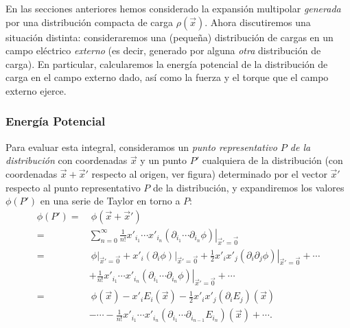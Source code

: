 En las secciones anteriores hemos considerado la expansión multipolar
\textit{generada} por una distribución compacta de carga
$\rho(\vec{x})$. Ahora discutiremos una situación distinta: consideraremos
una (peque\~na) distribución de cargas en un campo eléctrico
\textit{externo} (es decir, generado por alguna \textit{otra} distribución de
carga). En particular, calcularemos la energía potencial de la
distribución de carga en el campo externo dado, así como la fuerza y el
torque que el campo externo ejerce.

\subsubsection{Energía Potencial} \label{ed3_3_1}


Para evaluar esta integral, consideramos un \textit{punto representativo $P$ de la
distribución} con coordenadas $\vec{x}$ y un punto $P'$ cualquiera de la
distribución  (con coordenadas $\vec{x}+\vec{x}'$ respecto
al origen, ver figura) determinado por el vector $\vec{x}'$ respecto al punto
representativo $P$ de la distribución, y expandiremos los valores $\phi(P')$ en
una serie de Taylor en torno a $P$:
\begin{align} \label{eq3.3.3}
\phi(P') = &\ \phi(\vec{x}+\vec{x}')\\
= & \sum_{n=0}^\infty\frac{1}{n!}x'_{i_1}\cdots
x'_{i_n}\left.(\partial_{i_1}\cdots\partial_{i_n}\phi)\right|_{\vec{x}'=\vec{0}} \\
= &\ \left.\phi\right|_{\vec{x}'=\vec{0}}+x'_i\left.(\partial_i\phi)\right|_{\vec{
x}'=\vec{0}}+\frac{1}{2}x'_ix'_j\left.(\partial_i\partial_j\phi)\right|_{\vec{x}
'=\vec{0}}+\cdots \nonumber\\
& +\frac{1}{n!}x'_{i_1}\cdots
x'_{i_n}\left.(\partial_{i_1}\cdots\partial_{i_n}\phi)\right|_{\vec{x}'=\vec{0}}
+\cdots\\
= &\ \phi(\vec{x})-x'_iE_i(\vec{x})-\frac{1}{2}x'_ix'_j(\partial_iE_j)(\vec{x}
) \nonumber \\
& -\cdots-\frac{1}{n!}x'_{i_1}\cdots
x'_{i_n}(\partial_{i_1}\cdots\partial_{i_{n-1}}E_{i_n})(\vec{x})+\cdots .
\end{align}

